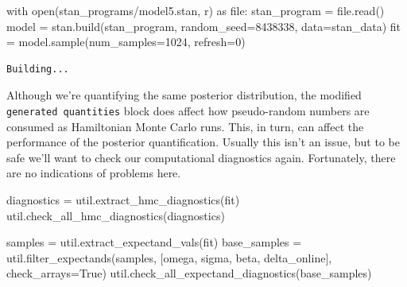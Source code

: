 \documentclass[
  letterpaper,
  DIV=11,
  numbers=noendperiod]{scrartcl}
\newenvironment{Shaded}{\begin{snugshade}}{\end{snugshade}}
\newcommand{\BuiltInTok}[1]{\textcolor[rgb]{0.00,0.23,0.31}{#1}}
\newcommand{\ControlFlowTok}[1]{\textcolor[rgb]{0.00,0.23,0.31}{#1}}
\newcommand{\DecValTok}[1]{\textcolor[rgb]{0.68,0.00,0.00}{#1}}
\newcommand{\ImportTok}[1]{\textcolor[rgb]{0.00,0.46,0.62}{#1}}
\newcommand{\NormalTok}[1]{\textcolor[rgb]{0.00,0.23,0.31}{#1}}
\newcommand{\OperatorTok}[1]{\textcolor[rgb]{0.37,0.37,0.37}{#1}}
\newcommand{\StringTok}[1]{\textcolor[rgb]{0.13,0.47,0.30}{#1}}
\newcommand{\VariableTok}[1]{\textcolor[rgb]{0.07,0.07,0.07}{#1}}
\begin{document}
\begin{Shaded}
\begin{Highlighting}[]
\ControlFlowTok{with} \BuiltInTok{open}\NormalTok{(}\StringTok{\textquotesingle{}stan\_programs/model5.stan\textquotesingle{}}\NormalTok{, }\StringTok{\textquotesingle{}r\textquotesingle{}}\NormalTok{) }\ImportTok{as} \BuiltInTok{file}\NormalTok{:}
\NormalTok{  stan\_program }\OperatorTok{=} \BuiltInTok{file}\NormalTok{.read()}
\NormalTok{model }\OperatorTok{=}\NormalTok{ stan.build(stan\_program,}
\NormalTok{                   random\_seed}\OperatorTok{=}\DecValTok{8438338}\NormalTok{,}
\NormalTok{                   data}\OperatorTok{=}\NormalTok{stan\_data)}
\NormalTok{fit }\OperatorTok{=}\NormalTok{ model.sample(num\_samples}\OperatorTok{=}\DecValTok{1024}\NormalTok{, refresh}\OperatorTok{=}\DecValTok{0}\NormalTok{)}
\end{Highlighting}
\end{Shaded}

\begin{verbatim}
Building...
\end{verbatim}

Although we're quantifying the same posterior distribution, the modified
\texttt{generated\ quantities} block does affect how pseudo-random
numbers are consumed as Hamiltonian Monte Carlo runs. This, in turn, can
affect the performance of the posterior quantification. Usually this
isn't an issue, but to be safe we'll want to check our computational
diagnostics again. Fortunately, there are no indications of problems
here.

\begin{Shaded}
\begin{Highlighting}[]
\NormalTok{diagnostics }\OperatorTok{=}\NormalTok{ util.extract\_hmc\_diagnostics(fit)}
\NormalTok{util.check\_all\_hmc\_diagnostics(diagnostics)}

\NormalTok{samples }\OperatorTok{=}\NormalTok{ util.extract\_expectand\_vals(fit)}
\NormalTok{base\_samples }\OperatorTok{=}\NormalTok{ util.filter\_expectands(samples,}
\NormalTok{                                      [}\StringTok{\textquotesingle{}omega\textquotesingle{}}\NormalTok{, }\StringTok{\textquotesingle{}sigma\textquotesingle{}}\NormalTok{,}
                                       \StringTok{\textquotesingle{}beta\textquotesingle{}}\NormalTok{, }\StringTok{\textquotesingle{}delta\_online\textquotesingle{}}\NormalTok{],}
\NormalTok{                                      check\_arrays}\OperatorTok{=}\VariableTok{True}\NormalTok{)}
\NormalTok{util.check\_all\_expectand\_diagnostics(base\_samples)}
\end{Highlighting}
\end{Shaded}
\end{document}
